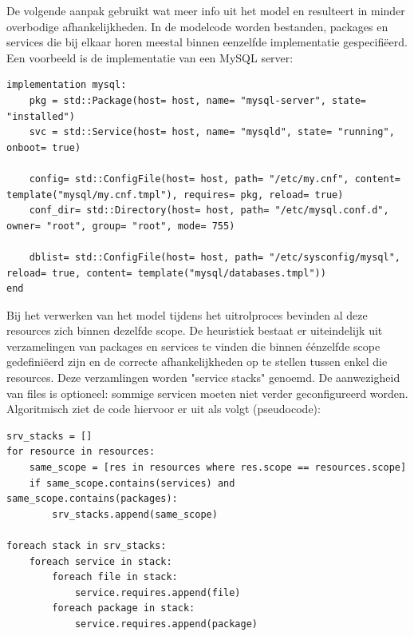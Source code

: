 De volgende aanpak gebruikt wat meer info uit het model en resulteert in minder overbodige afhankelijkheden.
In de modelcode worden bestanden, packages en services die bij elkaar horen meestal binnen eenzelfde implementatie gespecifi\"eerd.
Een voorbeeld is de implementatie van een MySQL server:

\begin{minipage}{\textwidth}
\begin{lstlisting}
implementation mysql:
    pkg = std::Package(host= host, name= "mysql-server", state= "installed")
    svc = std::Service(host= host, name= "mysqld", state= "running", onboot= true)

    config= std::ConfigFile(host= host, path= "/etc/my.cnf", content= template("mysql/my.cnf.tmpl"), requires= pkg, reload= true)
    conf_dir= std::Directory(host= host, path= "/etc/mysql.conf.d", owner= "root", group= "root", mode= 755)

    dblist= std::ConfigFile(host= host, path= "/etc/sysconfig/mysql", reload= true, content= template("mysql/databases.tmpl"))
end
\end{lstlisting}
\end{minipage}

Bij het verwerken van het model tijdens het uitrolproces bevinden al deze resources zich binnen dezelfde scope.
De heuristiek bestaat er uiteindelijk uit verzamelingen van packages en services te vinden die binnen \'e\'enzelfde scope gedefini\"eerd zijn en de correcte afhankelijkheden op te stellen tussen enkel die resources.
Deze verzamlingen worden "service stacks"  genoemd.
De aanwezigheid van files is optioneel: sommige servicen moeten niet verder geconfigureerd worden.
Algoritmisch ziet de code hiervoor  er uit als volgt (pseudocode):

\begin{minipage}{\textwidth}
\begin{lstlisting}
srv_stacks = []
for resource in resources:
    same_scope = [res in resources where res.scope == resources.scope]
    if same_scope.contains(services) and same_scope.contains(packages):
        srv_stacks.append(same_scope)

foreach stack in srv_stacks:
    foreach service in stack:
        foreach file in stack:
            service.requires.append(file)
        foreach package in stack:
            service.requires.append(package)
\end{lstlisting}
\end{minipage}

